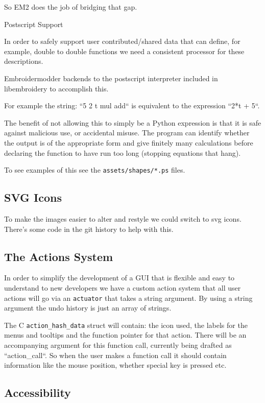 \documentclass[a4paper]{report}
\begin{document}
So EM2 does the job of bridging that gap.

Postscript Support
~~~~~~~~~~~~~~~~~~

In order to safely support user contributed/shared data that can define, for
example, double to double functions we need a consistent processor for these
descriptions.

Embroidermodder backends to the postscript interpreter included in libembroidery
to accomplish this.

For example the string: ``5 2 t mul add`` is equivalent to
the expression ``2*t + 5``.

The benefit of not allowing this to simply be a Python expression is that it is safe against
malicious use, or accidental misuse. The program can identify whether the output is of the
appropriate form and give finitely many calculations before declaring the function to have run
too long (stopping equations that hang).

To see examples of this see the \texttt{assets/shapes/*.ps} files.

\subsection{SVG Icons}

To make the images easier to alter and restyle we could switch to svg icons.
There's some code in the git history to help with this.

\subsection{The Actions System}

In order to simplify the development of a GUI that is flexible and easy to
understand to new developers we have a custom action system that all user
actions will go via an \texttt{actuator} that takes a string argument. By using a
string argument the undo history is just an array of strings.

The C \texttt{action\_hash\_data} struct will contain: the icon used, the
labels for the menus and tooltips and the function pointer for that action.
There will be an accompanying argument for this function call, currently being
drafted as ``action_call``. So when the user makes a function call it should
contain information like the mouse position, whether special key is pressed etc.

\subsection{Accessibility}
\end{document}
